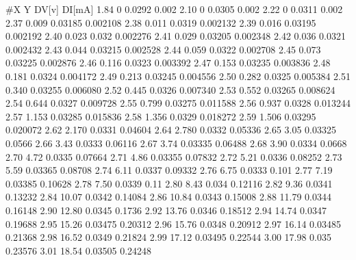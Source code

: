 #X	Y		DV[v]		DI[mA]
1.84	0		0.0292		0.002
2.10	0		0.0305		0.002
2.22	0		0.0311		0.002
2.37	0.009		0.03185	0.002108
2.38	0.011		0.0319		0.002132
2.39	0.016		0.03195	0.002192
2.40	0.023		0.032		0.002276
2.41	0.029		0.03205	0.002348
2.42	0.036		0.0321		0.002432
2.43	0.044		0.03215	0.002528
2.44	0.059		0.0322		0.002708
2.45	0.073		0.03225	0.002876
2.46	0.116		0.0323		0.003392
2.47	0.153		0.03235	0.003836
2.48	0.181		0.0324		0.004172	
2.49	0.213		0.03245	0.004556
2.50	0.282		0.0325		0.005384
2.51	0.340		0.03255	0.006080
2.52	0.445		0.0326		0.007340
2.53	0.552		0.03265	0.008624
2.54	0.644		0.0327		0.009728
2.55	0.799		0.03275	0.011588
2.56	0.937		0.0328		0.013244
2.57	1.153		0.03285	0.015836
2.58	1.356		0.0329		0.018272
2.59	1.506		0.03295	0.020072
2.62	2.170		0.0331		0.04604
2.64	2.780		0.0332		0.05336
2.65	3.05		0.03325	0.0566
2.66	3.43		0.0333		0.06116
2.67	3.74		0.03335	0.06488
2.68	3.90		0.0334		0.0668
2.70 	4.72		0.0335		0.07664
2.71	4.86		0.03355	0.07832
2.72	5.21		0.0336		0.08252
2.73	5.59		0.03365	0.08708
2.74	6.11		0.0337		0.09332
2.76	6.75		0.0333		0.101
2.77	7.19		0.03385	0.10628
2.78	7.50		0.0339		0.11
2.80	8.43		0.034		0.12116
2.82	9.36		0.0341		0.13232
2.84	10.07		0.0342		0.14084
2.86	10.84		0.0343		0.15008
2.88	11.79		0.0344		0.16148
2.90	12.80		0.0345		0.1736
2.92	13.76		0.0346		0.18512
2.94	14.74		0.0347		0.19688
2.95	15.26		0.03475	0.20312
2.96	15.76		0.0348		0.20912
2.97	16.14		0.03485	0.21368
2.98	16.52		0.0349		0.21824
2.99	17.12		0.03495	0.22544
3.00	17.98		0.035		0.23576
3.01	18.54		0.03505	0.24248


